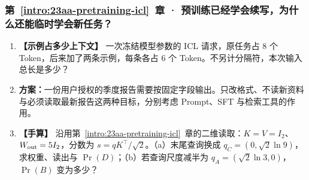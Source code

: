 \subsubsection*{第~\ref*{intro:23aa-pretraining-icl}~章 · 预训练已经学会续写，为什么还能临时学会新任务？}
\begin{enumerate}[label={},leftmargin=4.8em,itemsep=4pt]
\item[\textbf{C-092.}] \leavevmode{}\label{exercise:C-092}\label{exercise:icl-context-budget}\textbf{【示例占多少上下文】} 一次冻结模型参数的 ICL 请求，原任务占 $8$ 个 Token，后来加了两条示例，每条各占 $6$ 个 Token。不另计分隔符，本次输入总长是多少？
\item[\textbf{C-093.}] \leavevmode{}\label{exercise:C-093}\label{exercise:prompt-or-training}\textbf{方案：}一份用户授权的季度报告需要按固定字段输出。只改格式、不读新资料与必须读取最新报告这两种目标，分别考虑 Prompt、SFT 与检索工具的作用。
\item[\textbf{C-094.}] \leavevmode{}\label{exercise:C-094}\label{exercise:icl-query-transfer}\textbf{【手算】} 沿用第~\ref*{intro:23aa-pretraining-icl}~章的二维读取：$K=V=I_2$、$W_{\rm out}=5I_2$，分数为 $s=qK^\top/\sqrt2$。（a）末尾查询换成 $q_C=(0,\sqrt2\ln9)$，求权重、读出与 $\Pr(D)$；（b）若查询尺度减半为 $q_A=(\sqrt2\ln3,0)$，$\Pr(B)$ 变为多少？
\end{enumerate}
